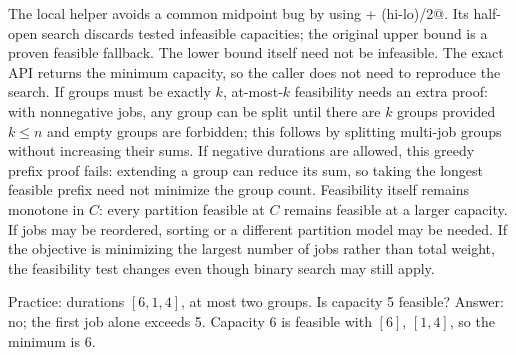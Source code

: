The local helper avoids a common midpoint bug by using
\verb@lo + (hi-lo)/2@. Its half-open search discards tested infeasible
capacities; the original upper bound is a proven feasible fallback. The
lower bound itself need not be infeasible. The exact API returns
the minimum capacity, so the caller does not need to reproduce the search.
If groups must be exactly $k$, at-most-$k$ feasibility needs an extra proof:
with nonnegative jobs, any group can be split until there are $k$ groups
provided $k\le n$ and empty groups are forbidden; this follows by splitting
multi-job groups without increasing their sums. If negative durations are
allowed, this greedy prefix proof fails: extending a group can reduce its
sum, so taking the longest feasible prefix need not minimize the group count.
Feasibility itself remains monotone in $C$: every partition feasible at $C$
remains feasible at a larger capacity. If jobs may be
reordered, sorting or a different partition model may be needed. If the
objective is minimizing the largest number of jobs rather than total weight,
the feasibility test changes even though binary search may still apply.

Practice: durations $[6,1,4]$, at most two groups. Is capacity 5 feasible?
Answer: no; the first job alone exceeds 5.
Capacity 6 is feasible with $[6]$, $[1,4]$, so the minimum is 6.
